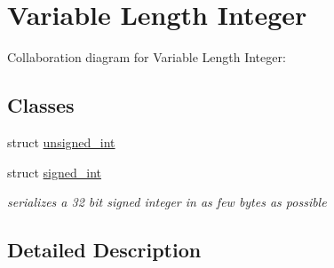 \hypertarget{group__varint}{}\section{Variable Length Integer}
\label{group__varint}
Collaboration diagram for Variable Length Integer\+:
\subsection*{Classes}
\begin{DoxyCompactItemize}
\item 
struct \mbox{\hyperlink{structunsigned__int}{unsigned\+\_\+int}}
\item 
struct \mbox{\hyperlink{structsigned__int}{signed\+\_\+int}}
\begin{DoxyCompactList}\small\item\em serializes a 32 bit signed integer in as few bytes as possible \end{DoxyCompactList}\end{DoxyCompactItemize}


\subsection{Detailed Description}
